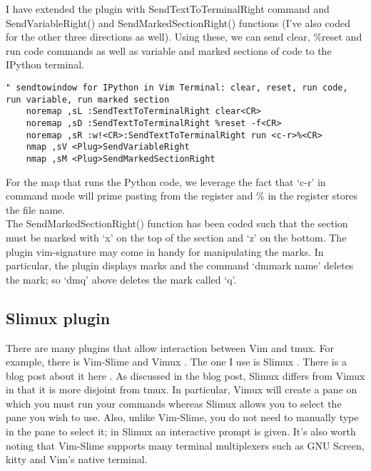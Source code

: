 I have extended the plugin with SendTextToTerminalRight command and SendVariableRight()
and SendMarkedSectionRight() functions (I've also coded for the other three directions as
well). Using these, we can send clear, \%reset and run code commands as well as
variable and marked sections of code to the IPython terminal.
\begin{lstlisting}
" sendtowindow for IPython in Vim Terminal: clear, reset, run code, run variable, run marked section
    noremap ,sL :SendTextToTerminalRight clear<CR>
    noremap ,sD :SendTextToTerminalRight %reset -f<CR>
    noremap ,sR :w!<CR>:SendTextToTerminalRight run <c-r>%<CR>
    nmap ,sV <Plug>SendVariableRight
    nmap ,sM <Plug>SendMarkedSectionRight
\end{lstlisting}
For the map that runs the Python code, we leverage the fact that
`\tlangle c-r\trangle' in command mode will prime pasting from the register and
\% in the register stores the file name.\\

The SendMarkedSectionRight() function has been coded such that the section must
be marked with `x' on the top of the section and `z' on the bottom.  The plugin
vim-signature \cite{kshenoy2015signature} may come in handy for manipulating the
marks. In particular, the plugin displays marks and the command `dm\tlangle mark
name\trangle' deletes the mark; so `dmq' above deletes the mark called `q'.

\subsection{Slimux plugin}
There are many plugins that allow interaction between Vim and tmux. For example,
there is Vim-Slime \cite{jpalardy2012slime} and Vimux \cite{benmills2009vimux}.
The one I use is Slimux \cite{esamattis2015slimux}. There is a blog post about
it here \cite{suuronen2012slimux}. As discussed in the blog post, Slimux differs
from Vimux in that it is more disjoint from tmux. In particular, Vimux will
create a pane on which you must run your commands whereas Slimux allows you to
select the pane you wish to use. Also, unlike Vim-Slime, you do not need to
manually type in the pane to select it; in Slimux an interactive prompt is
given. It's also worth noting that Vim-Slime supports many terminal multiplexers
such as GNU Screen, kitty and Vim's native terminal.\\


